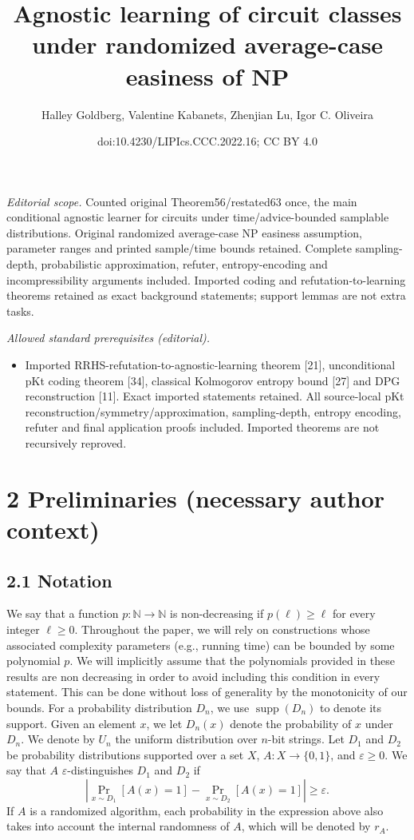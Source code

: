 \documentclass[10pt,a4paper]{article}
\title{Agnostic learning of circuit classes under randomized average-case easiness of NP}
\author{Halley Goldberg, Valentine Kabanets, Zhenjian Lu, Igor C. Oliveira}
\date{doi:10.4230/LIPIcs.CCC.2022.16; CC BY 4.0}
\begin{document}
\maketitle
\noindent\textit{Editorial scope.} Counted original Theorem56/restated63 once, the main conditional agnostic learner for circuits under time/advice-bounded samplable distributions. Original randomized average-case NP easiness assumption, parameter ranges and printed sample/time bounds retained. Complete sampling-depth, probabilistic approximation, refuter, entropy-encoding and incompressibility arguments included. Imported coding and refutation-to-learning theorems retained as exact background statements; support lemmas are not extra tasks.\par\medskip
\noindent\textit{Allowed standard prerequisites (editorial).}\begin{itemize}
\item Imported RRHS-refutation-to-agnostic-learning theorem [21], unconditional pKt coding theorem [34], classical Kolmogorov entropy bound [27] and DPG reconstruction [11]. Exact imported statements retained. All source-local pKt reconstruction/symmetry/approximation, sampling-depth, entropy encoding, refuter and final application proofs included. Imported theorems are not recursively reproved.
\end{itemize}\medskip
\section*{2 Preliminaries (necessary author context)}
\subsection*{2.1 Notation}
We say that a function $p:\mathbb N\to\mathbb N$ is non-decreasing if $p(\ell)\geq\ell$ for every integer $\ell\geq0$. Throughout the paper, we will rely on constructions whose associated complexity parameters (e.g., running time) can be bounded by some polynomial $p$. We will implicitly assume that the polynomials provided in these results are non decreasing in order to avoid including this condition in every statement. This can be done without loss of generality by the monotonicity of our bounds.
For a probability distribution $D_n$, we use $\operatorname{supp}(D_n)$ to denote its support. Given an element $x$, we let $D_n(x)$ denote the probability of $x$ under $D_n$. We denote by $U_n$ the uniform distribution over $n$-bit strings.
Let $D_1$ and $D_2$ be probability distributions supported over a set $X$, $A:X\to\{0,1\}$, and $\varepsilon\geq0$. We say that $A$ $\varepsilon$-distinguishes $D_1$ and $D_2$ if
\[\left|\Pr_{x\sim D_1}[A(x)=1]-\Pr_{x\sim D_2}[A(x)=1]\right|\geq\varepsilon.\]
If $A$ is a randomized algorithm, each probability in the expression above also takes into account the internal randomness of $A$, which will be denoted by $r_A$.
\end{document}
